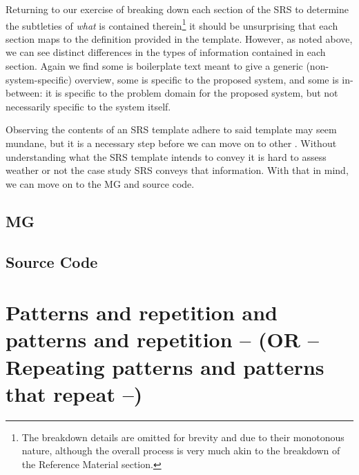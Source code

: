 Returning to our exercise of breaking down each section of the SRS to determine 
the subtleties of \emph{what} is contained therein\footnote{The breakdown 
details are omitted for brevity and due to their monotonous nature, although 
the overall process is very much akin to the breakdown of the Reference 
Material section.} it should be unsurprising that each section maps to the 
definition provided in the \smithea{} template. However, as noted above, we can 
see distinct differences in the types of information contained in each section. 
Again we find some is boilerplate text meant to give a generic 
(non-system-specific) overview, some is specific to the proposed system, and 
some is in-between: it is specific to the problem domain for the proposed 
system, but not necessarily specific to the system itself.

Observing the contents of an SRS template adhere to said template may seem 
mundane, but it is a necessary step before we can move on to other \sfs{}. 
Without understanding what the SRS template intends to convey it is hard to 
assess weather or not the case study SRS conveys that information. With that in 
mind, we can move on to the MG and source code.



\subsection{MG}

\subsection{Source Code}

\section{Patterns and repetition and patterns and repetition -- (OR -- 
Repeating patterns and patterns that repeat --)}
\label{sec:patterns}

